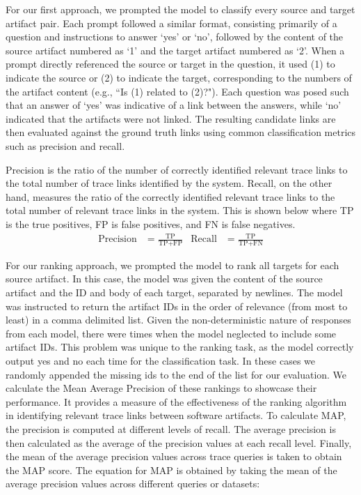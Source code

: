 For our first approach, we prompted the model to classify every source and target artifact pair. Each prompt followed a similar format, consisting primarily of a question and instructions to answer `yes' or `no', followed by the content of the source artifact numbered as `1' and the target artifact numbered as `2'. When a prompt directly referenced the source or target in the question, it used (1) to indicate the source or (2) to indicate the target, corresponding to the numbers of the artifact content (e.g., ``Is (1) related to (2)?"). Each question was posed such that an answer of `yes' was indicative of a link between the answers, while `no' indicated that the artifacts were not linked. The resulting candidate links are then evaluated against the ground truth links using common classification metrics such as precision and recall. 

Precision is the ratio of the number of correctly identified relevant trace links to the total number of trace links identified by the system. Recall, on the other hand, measures the ratio of the correctly identified relevant trace links to the total number of relevant trace links in the system. This is shown below where TP is the true positives, FP is false positives, and FN is false negatives.
\begin{align*}
\text{Precision} &= \frac{\text{TP}}{\text{TP} + \text{FP}} &
\text{Recall}    &= \frac{\text{TP}}{\text{TP} + \text{FN}}
\end{align*}

For our ranking approach, we prompted the model to rank all targets for each source artifact. In this case, the model was given the content of the source artifact and the ID and body of each target, separated by newlines. The model was instructed to return the artifact IDs in the order of relevance (from most to least) in a comma delimited list. Given the non-deterministic nature of responses from each model, there were times when the model neglected to include some artifact IDs. This problem was unique to the ranking task, as the model correctly output yes and no each time for the classification task. In these cases we randomly appended the missing ids to the end of the list for our evaluation. We calculate the Mean Average Precision of these rankings to showcase their performance. It provides a measure of the effectiveness of the ranking algorithm in identifying relevant trace links between software artifacts. To calculate MAP, the precision is computed at different levels of recall. The average precision is then calculated as the average of the precision values at each recall level. Finally, the mean of the average precision values across trace queries is taken to obtain the MAP score. The equation for MAP is obtained by taking the mean of the average precision values across different queries or datasets:

